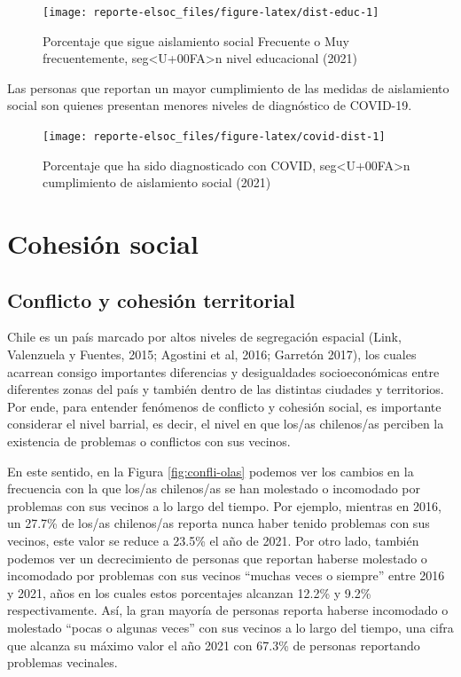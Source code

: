 \documentclass[
  12pt,
]{book}
\begin{document}
\begin{figure}

{\centering \texttt{[image: reporte-elsoc\_files/figure-latex/dist-educ-1]} 

}

\caption{Porcentaje que sigue aislamiento social Frecuente o Muy frecuentemente, seg<U+00FA>n nivel educacional (2021)}\label{fig:dist-educ}
\end{figure}

Las personas que reportan un mayor cumplimiento de las medidas de aislamiento social son quienes presentan menores niveles de diagnóstico de COVID-19.

\begin{figure}

{\centering \texttt{[image: reporte-elsoc\_files/figure-latex/covid-dist-1]} 

}

\caption{Porcentaje que ha sido diagnosticado con COVID, seg<U+00FA>n cumplimiento de aislamiento social (2021)}\label{fig:covid-dist}
\end{figure}

\hypertarget{cohesiuxf3n-social}{%
\chapter{Cohesión social}\label{cohesiuxf3n-social}}

\hypertarget{conflicto-y-cohesiuxf3n-territorial}{%
\section{Conflicto y cohesión territorial}\label{conflicto-y-cohesiuxf3n-territorial}}

Chile es un país marcado por altos niveles de segregación espacial (Link, Valenzuela y Fuentes, 2015; Agostini et al, 2016; Garretón 2017), los cuales acarrean consigo importantes diferencias y desigualdades socioeconómicas entre diferentes zonas del país y también dentro de las distintas ciudades y territorios. Por ende, para entender fenómenos de conflicto y cohesión social, es importante considerar el nivel barrial, es decir, el nivel en que los/as chilenos/as perciben la existencia de problemas o conflictos con sus vecinos.

En este sentido, en la Figura \ref{fig:confli-olas} podemos ver los cambios en la frecuencia con la que los/as chilenos/as se han molestado o incomodado por problemas con sus vecinos a lo largo del tiempo. Por ejemplo, mientras en 2016, un 27.7\% de los/as chilenos/as reporta nunca haber tenido problemas con sus vecinos, este valor se reduce a 23.5\% el año de 2021. Por otro lado, también podemos ver un decrecimiento de personas que reportan haberse molestado o incomodado por problemas con sus vecinos ``muchas veces o siempre'' entre 2016 y 2021, años en los cuales estos porcentajes alcanzan 12.2\% y 9.2\% respectivamente. Así, la gran mayoría de personas reporta haberse incomodado o molestado ``pocas o algunas veces'' con sus vecinos a lo largo del tiempo, una cifra que alcanza su máximo valor el año 2021 con 67.3\% de personas reportando problemas vecinales.
\end{document}
